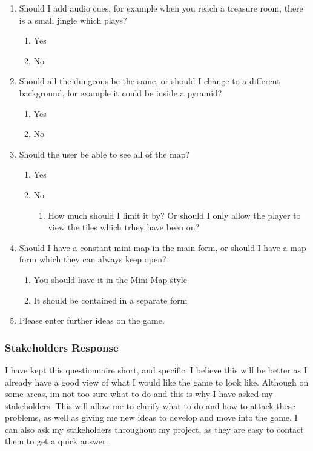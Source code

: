 \documentclass[12pt]{article}
\begin{document}
\begin{enumerate}
	\item{Should I add audio cues, for example when you reach a treasure room, there is a small jingle which plays?}
		\begin{enumerate}
		\item Yes
		\item No
		\end{enumerate}
			
	\item{Should all the dungeons be the same, or should I change to a different background, for example it could be inside a pyramid?}
		\begin{enumerate}
		\item Yes
		\item No
		\end{enumerate}

	\item{Should the user be able to see all of the map?}
		\begin{enumerate}
		\item Yes
		\item No
			\begin{enumerate}
				\item How much should I limit it by? Or should I only allow the player to view the tiles which trhey have been on?
			\end{enumerate}
		\end{enumerate}

			
	\item{Should I have a constant mini-map in the main form, or should I have a map form which they can always keep open?}
		\begin{enumerate}
		\item You should have it in the Mini Map style
		\item It should be contained in a separate form
		\end{enumerate}
			
	\item{Please enter further ideas on the game.}
\end{enumerate}	



			\subsubsection{Stakeholders Response}


I have kept this questionnaire short, and specific. I believe this will be better as I already have a good view of what I would like the game to look like. Although on some areas, im not too sure what to do and this is why I have asked my stakeholders. This will allow me to clarify what to do and how to attack these problems, as well as giving me new ideas to develop and move into the game. I can also ask my stakeholders throughout my project, as they are easy to contact them to get a quick answer.
\end{document}
